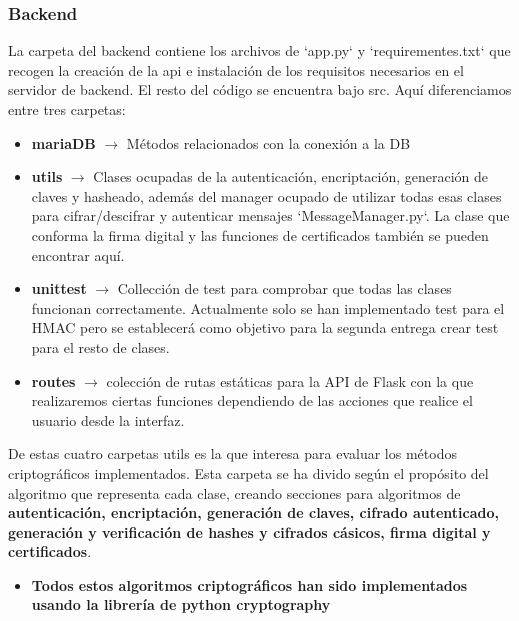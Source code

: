 \documentclass[a4paper,11pt]{article}
\begin{document}
\subsubsection{Backend}
La carpeta del backend contiene los archivos de `app.py` y `requirementes.txt` que recogen la creación de la api e instalación de los requisitos necesarios en el servidor de backend. El resto del código se encuentra bajo src. Aquí diferenciamos entre tres carpetas:
\begin{itemize}
\item \textbf{mariaDB} $\rightarrow$ Métodos relacionados con la conexión a la DB

\item \textbf{utils} $\rightarrow$ Clases ocupadas de la autenticación, encriptación, generación de claves y hasheado, además del manager ocupado de utilizar todas esas clases para cifrar/descifrar y autenticar mensajes `MessageManager.py`. La clase que conforma la firma digital y las funciones de certificados también se pueden encontrar aquí.

\item \textbf{unittest} $\rightarrow$ Collección de test para comprobar que
    todas las clases funcionan correctamente. Actualmente solo se han
    implementado test para el HMAC pero se establecerá como objetivo para la
    segunda entrega crear test para el resto de clases.

\item \textbf{routes} $\rightarrow$ colección de rutas estáticas para la API de 
    Flask con la que realizaremos ciertas funciones dependiendo de las acciones que
    realice el usuario desde la interfaz.
    
\end{itemize}

De estas cuatro carpetas utils es la que interesa para evaluar los métodos
criptográficos implementados. Esta carpeta se ha divido según el propósito del
algoritmo que representa cada clase, creando secciones para algoritmos de
\textbf{autenticación, encriptación, generación de claves, cifrado autenticado, generación y verificación de hashes y
cifrados cásicos, firma digital y certificados}. \\

\begin{itemize}
    \item \textbf{Todos estos algoritmos criptográficos han sido implementados usando la librería de python cryptography}
\end{itemize}
\end{document}
